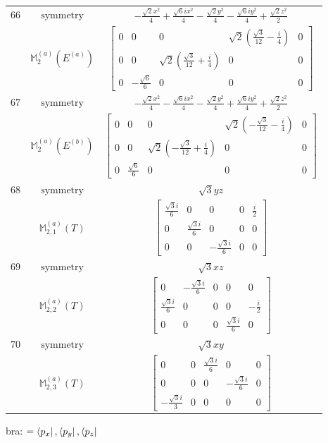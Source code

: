 \documentclass[fleqn,8pt,landscape]{jsarticle}
\begin{document}
\begin{longtable}{ccc}
$ 66 $ & $ \text{symmetry} $ & $ - \frac{\sqrt{2} x^{2}}{4} + \frac{\sqrt{6} i x^{2}}{4} - \frac{\sqrt{2} y^{2}}{4} - \frac{\sqrt{6} i y^{2}}{4} + \frac{\sqrt{2} z^{2}}{2} $ \\
$  $ & $ \mathbb{M}_{2}^{(a)}(E^{(a)}) $ & $ \begin{bmatrix} 0 & 0 & 0 & \sqrt{2} \left(\frac{\sqrt{3}}{12} - \frac{i}{4}\right) & 0 \\ 0 & 0 & \sqrt{2} \left(\frac{\sqrt{3}}{12} + \frac{i}{4}\right) & 0 & 0 \\ 0 & - \frac{\sqrt{6}}{6} & 0 & 0 & 0 \end{bmatrix} $ \\ \hline
$ 67 $ & $ \text{symmetry} $ & $ - \frac{\sqrt{2} x^{2}}{4} - \frac{\sqrt{6} i x^{2}}{4} - \frac{\sqrt{2} y^{2}}{4} + \frac{\sqrt{6} i y^{2}}{4} + \frac{\sqrt{2} z^{2}}{2} $ \\
$  $ & $ \mathbb{M}_{2}^{(a)}(E^{(b)}) $ & $ \begin{bmatrix} 0 & 0 & 0 & \sqrt{2} \left(- \frac{\sqrt{3}}{12} - \frac{i}{4}\right) & 0 \\ 0 & 0 & \sqrt{2} \left(- \frac{\sqrt{3}}{12} + \frac{i}{4}\right) & 0 & 0 \\ 0 & \frac{\sqrt{6}}{6} & 0 & 0 & 0 \end{bmatrix} $ \\ \hline
$ 68 $ & $ \text{symmetry} $ & $ \sqrt{3} y z $ \\
$  $ & $ \mathbb{M}_{2,1}^{(a)}(T) $ & $ \begin{bmatrix} \frac{\sqrt{3} i}{6} & 0 & 0 & 0 & \frac{i}{2} \\ 0 & \frac{\sqrt{3} i}{6} & 0 & 0 & 0 \\ 0 & 0 & - \frac{\sqrt{3} i}{6} & 0 & 0 \end{bmatrix} $ \\ \hline
$ 69 $ & $ \text{symmetry} $ & $ \sqrt{3} x z $ \\
$  $ & $ \mathbb{M}_{2,2}^{(a)}(T) $ & $ \begin{bmatrix} 0 & - \frac{\sqrt{3} i}{6} & 0 & 0 & 0 \\ \frac{\sqrt{3} i}{6} & 0 & 0 & 0 & - \frac{i}{2} \\ 0 & 0 & 0 & \frac{\sqrt{3} i}{6} & 0 \end{bmatrix} $ \\ \hline
$ 70 $ & $ \text{symmetry} $ & $ \sqrt{3} x y $ \\
$  $ & $ \mathbb{M}_{2,3}^{(a)}(T) $ & $ \begin{bmatrix} 0 & 0 & \frac{\sqrt{3} i}{6} & 0 & 0 \\ 0 & 0 & 0 & - \frac{\sqrt{3} i}{6} & 0 \\ - \frac{\sqrt{3} i}{3} & 0 & 0 & 0 & 0 \end{bmatrix} $ \\ \hline
\end{longtable}
bra: $=\bra{p_{x}}, \bra{p_{y}}, \bra{p_{z}}$
\end{document}
